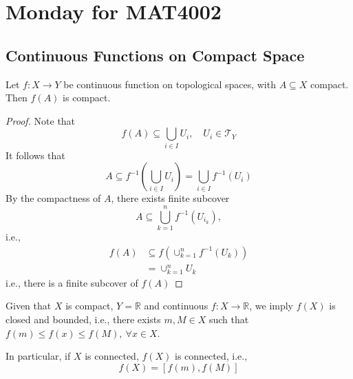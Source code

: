 \section{Monday for MAT4002}
\subsection{Continuous Functions on Compact Space}

\begin{proposition}
Let $f:X\to Y$ be continuous function on topological spaces, with $A\subseteq X$ compact. Then $f(A)$ is compact.
\end{proposition}
\begin{proof}
Note that
\[
f(A)\subseteq\bigcup_{i\in I}U_i,\quad U_i\in\mathcal{T}_Y
\]
It follows that
\[
A\subseteq f^{-1}\left(\bigcup_{i\in I}U_i\right)=\bigcup_{i\in I}f^{-1}(U_i)
\]
By the compactness of $A$, there exists finite subcover
\[
A\subseteq\bigcup_{k=1}^nf^{-1}(U_{i_k}),
\]
i.e.,
\begin{align*}
f(A)&\subseteq f(\cup_{k=1}^nf^{-1}(U_k))\\
&=\cup_{k=1}^nU_k
\end{align*}
i.e., there is a finite subcover of $f(A)$
\end{proof}

\begin{corollary}
Given that $X$ is compact, $Y=\mathbb{R}$ and continuous $f:X\to\mathbb{R}$, we imply
$f(X)$ is closed and bounded, i.e., there exists $m,M\in X$ such that $f(m)\le f(x)\le f(M),\ \forall x\in X$.

In particular, if $X$ is connected, $f(X)$ is connected, i.e.,
\[
f(X)=[f(m),f(M)]
\]
\end{corollary}

